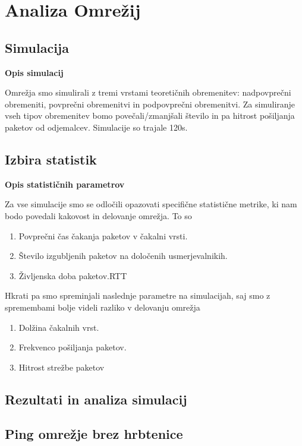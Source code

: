 \documentclass[11pt, a4paper, slovene]{book}
\begin{document}
\section{Analiza Omrežij} 
\subsection{Simulacija} 
\large \bf Opis simulacij 
\normalfont \normalsize

Omrežja smo simulirali z tremi vrstami teoretičnih obremenitev: nadpovprečni obremeniti, povprečni obremenitvi in podpovprečni obremenitvi. Za simuliranje vseh tipov obremenitev bomo povečali/zmanjšali število in pa hitrost pošiljanja paketov od odjemalcev. Simulacije so trajale 120s.  

\subsection{Izbira statistik} 
\large \bf Opis statističnih parametrov 
\normalfont \normalsize

Za vse simulacije smo se odločili opazovati specifične statistične metrike, ki nam bodo povedali kakovost in delovanje omrežja. To so

\begin{enumerate}
	\item Povprečni čas čakanja paketov v čakalni vrsti.
	\item Število izgubljenih paketov na določenih usmerjevalnikih.
	\item Življenska doba paketov.RTT
\end{enumerate}

Hkrati pa smo spreminjali naslednje parametre na simulacijah, saj smo z spremembami bolje videli razliko v delovanju omrežja

\begin{enumerate}
	\item Dolžina čakalnih vrst.
	\item Frekvenco pošiljanja paketov.
	\item Hitrost strežbe paketov
\end{enumerate}


	
\subsection{Rezultati in analiza simulacij}

\subsection{Ping omrežje brez hrbtenice}
\end{document}
